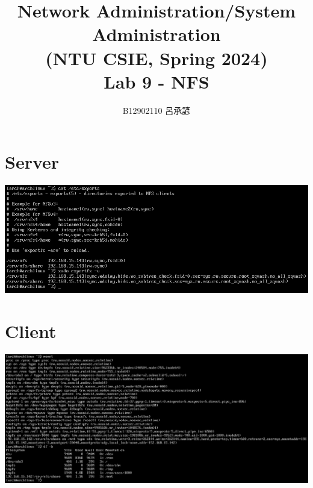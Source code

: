 \documentclass[12pt, a4paper]{article}
\title{
  \vspace{-1cm}
  Network Administration/System Administration\\
  (NTU CSIE, Spring 2024)\\
  Lab 9 - NFS
}
\author{\Large B12902110 呂承諺}
\begin{document}
  \maketitle

  \section{Server}
  \includegraphics[width=\textwidth]{24-04-28_00-50-31_vmware_Gk5W6qjTJw.png}

  \section{Client}
  \includegraphics[width=\textwidth]{24-04-28_00-51-20_vmware_ShQZGQuXfK.png}
\end{document}
